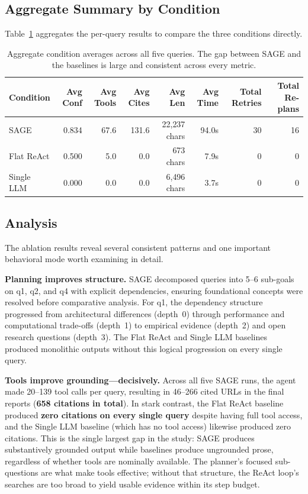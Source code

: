 \documentclass[11pt]{article}
\begin{document}
\subsection{Aggregate Summary by Condition}

Table~\ref{tab:aggregate} aggregates the per-query results to compare the three conditions directly.

\begin{table}[H]
\centering
\caption{Aggregate condition averages across all five queries. The gap between SAGE and the baselines is large and consistent across every metric.}
\label{tab:aggregate}
\small
\begin{tabular}{@{}lrrrrrrr@{}}
\toprule
\textbf{Condition} & \textbf{Avg Conf} & \textbf{Avg Tools} & \textbf{Avg Cites} & \textbf{Avg Len} & \textbf{Avg Time} & \textbf{Total Retries} & \textbf{Total Re-plans} \\
\midrule
SAGE        & 0.834 & 67.6 & 131.6 & 22{,}237 chars & 94.0s & 30 & 16 \\
Flat ReAct  & 0.500 &  5.0 &   0.0 &     673 chars &  7.9s &  0 &  0 \\
Single LLM  & 0.000 &  0.0 &   0.0 &  6{,}496 chars &  3.7s &  0 &  0 \\
\bottomrule
\end{tabular}
\end{table}

\subsection{Analysis}

The ablation results reveal several consistent patterns and one important behavioral mode worth examining in detail.

\textbf{Planning improves structure.} SAGE decomposed queries into 5--6 sub-goals on q1, q2, and q4 with explicit dependencies, ensuring foundational concepts were resolved before comparative analysis. For q1, the dependency structure progressed from architectural differences (depth~0) through performance and computational trade-offs (depth~1) to empirical evidence (depth~2) and open research questions (depth~3). The Flat ReAct and Single LLM baselines produced monolithic outputs without this logical progression on every single query.

\textbf{Tools improve grounding---decisively.} Across all five SAGE runs, the agent made 20--139 tool calls per query, resulting in 46--266 cited URLs in the final reports (\textbf{658 citations in total}). In stark contrast, the Flat ReAct baseline produced \textbf{zero citations on every single query} despite having full tool access, and the Single LLM baseline (which has no tool access) likewise produced zero citations. This is the single largest gap in the study: SAGE produces substantively grounded output while baselines produce ungrounded prose, regardless of whether tools are nominally available. The planner's focused sub-questions are what make tools effective; without that structure, the ReAct loop's searches are too broad to yield usable evidence within its step budget.
\end{document}
